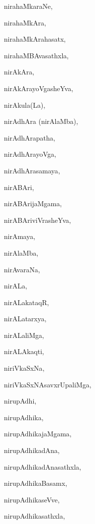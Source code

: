 \begin{multicols}{2}
{nirahaMkaraNe}, \pageref{nirahaMkaraNe}

{nirahaMkAra}, \pageref{nirahaMkAra}

{nirahaMkArahasatx}, \pageref{nirahaMkArahasatx}

{nirahaMBAvasathxla}, \pageref{nirahaMBAvasathxla}

{nirAkAra}, \pageref{nirAkAra}

{nirAkArayoVgasheYva}, \pageref{nirAkArayoVgasheYva}

{nirAkula(La)}, \pageref{nirAkulaLa}

{nirAdhAra (nirAlaMba)}, \pageref{nirAdhAra nirAlaMba}

{nirAdhArapatha}, \pageref{nirAdhArapatha}

{nirAdhArayoVga}, \pageref{nirAdhArayoVga}

{nirAdhArasamaya}, \pageref{nirAdhArasamaya}

{nirABAri}, \pageref{nirABAri}

{nirABArijaMgama}, \pageref{nirABArijaMgama}

{nirABAriviVrasheYva}, \pageref{nirABAriviVrasheYva}

{nirAmaya}, \pageref{nirAmaya}

{nirAlaMba}, \pageref{nirAlaMba}

{nirAvaraNa}, \pageref{nirAvaraNa}

{nirALa}, \pageref{nirALa}

{nirALakataqR}, \pageref{nirALakataqR}

{nirALatarxya}, \pageref{nirALatarxya}

{nirALaliMga}, \pageref{nirALaliMga}

{nirALAkaqti}, \pageref{nirALAkaqti}

{niriVkaSxNa}, \pageref{niriVkaSxNa}

{niriVkaSxNAsavxrUpaliMga}, \pageref{niriVkaSxNAsavxrUpaliMga}

{nirupAdhi}, \pageref{nirupAdhi}

{nirupAdhika}, \pageref{nirupAdhika}

{nirupAdhikajaMgama}, \pageref{nirupAdhikajaMgama}

{nirupAdhikadAna}, \pageref{nirupAdhikadAna}

{nirupAdhikadAnasathxla}, \pageref{nirupAdhikadAnasathxla}

{nirupAdhikaBasamx}, \pageref{nirupAdhikaBasamx}

{nirupAdhikaseVve}, \pageref{nirupAdhikaseVve}

{nirupAdhikasathxla}, \pageref{nirupAdhikasathxla}


\end{multicols}
